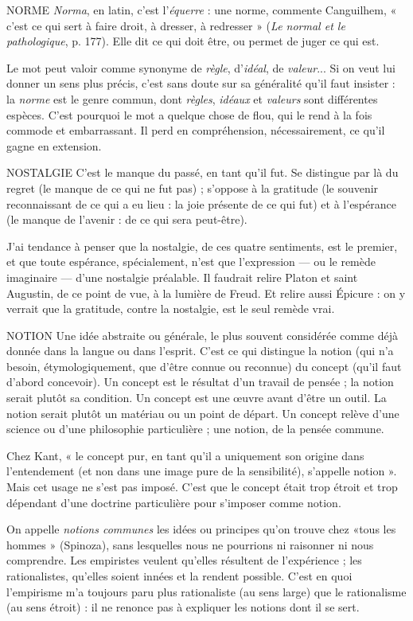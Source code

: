 NORME  {\it Norma}, en latin, c’est l’{\it équerre} : une norme, commente Canguilhem,
« c’est ce qui sert à faire droit, à dresser, à redresser » ({\it Le
normal et le pathologique}, p. 177). Elle dit ce qui doit être, ou permet de juger
ce qui est.

Le mot peut valoir comme synonyme de {\it règle}, d’{\it idéal}, de {\it valeur}... Si on
veut lui donner un sens plus précis, c’est sans doute sur sa généralité qu’il faut
insister : la {\it norme} est le genre commun, dont {\it règles}, {\it idéaux} et {\it valeurs} sont différentes
espèces. C’est pourquoi le mot a quelque chose de flou, qui le rend à la
fois commode et embarrassant. Il perd en compréhension, nécessairement, ce
qu’il gagne en extension.

NOSTALGIE C’est le manque du passé, en tant qu’il fut. Se distingue par là
du regret (le manque de ce qui ne fut pas) ; s'oppose à la gratitude
(le souvenir reconnaissant de ce qui a eu lieu : la joie présente de ce qui
fut) et à l'espérance (le manque de l’avenir : de ce qui sera peut-être).

J'ai tendance à penser que la nostalgie, de ces quatre sentiments, est le premier,
et que toute espérance, spécialement, n’est que l’expression — ou le
remède imaginaire — d’une nostalgie préalable. Il faudrait relire Platon et saint
Augustin, de ce point de vue, à la lumière de Freud. Et relire aussi Épicure : on
y verrait que la gratitude, contre la nostalgie, est le seul remède vrai.

NOTION Une idée abstraite ou générale, le plus souvent considérée comme
déjà donnée dans la langue ou dans l’esprit. C’est ce qui distingue
la notion (qui n’a besoin, étymologiquement, que d’être connue ou reconnue)
du concept (qu’il faut d’abord concevoir). Un concept est le résultat d’un travail
de pensée ; la notion serait plutôt sa condition. Un concept est une œuvre
avant d’être un outil. La notion serait plutôt un matériau ou un point de
départ. Un concept relève d’une science ou d’une philosophie particulière ; une
notion, de la pensée commune.

Chez Kant, « le concept pur, en tant qu’il a uniquement son origine dans
l’entendement (et non dans une image pure de la sensibilité), s'appelle notion ».
Mais cet usage ne s’est pas imposé. C’est que le concept était trop étroit et trop
dépendant d’une doctrine particulière pour s'imposer comme notion.

On appelle {\it notions communes} les idées ou principes qu’on trouve chez
«tous les hommes » (Spinoza), sans lesquelles nous ne pourrions ni raisonner
ni nous comprendre. Les empiristes veulent qu’elles résultent de l’expérience ;
les rationalistes, qu’elles soient innées et la rendent possible. C’est en quoi
l’empirisme m’a toujours paru plus rationaliste (au sens large) que le rationalisme
(au sens étroit) : il ne renonce pas à expliquer les notions dont il se sert.

